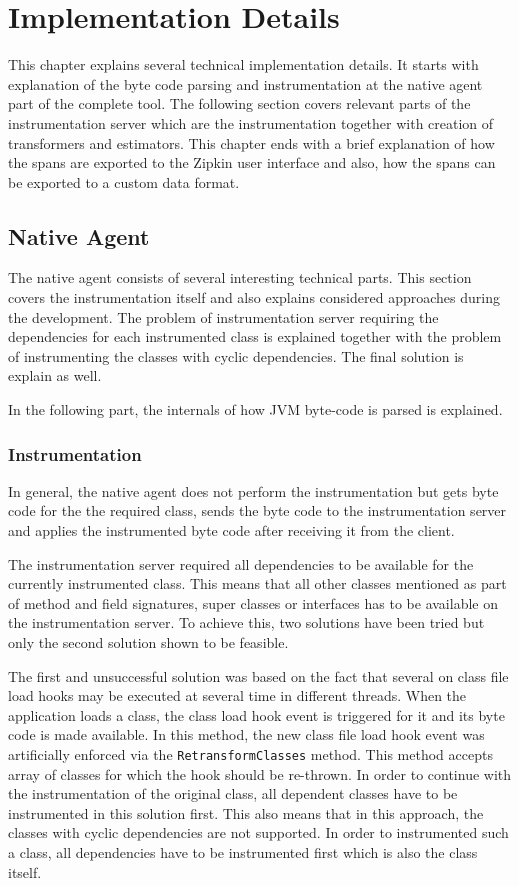 \chapter{Implementation Details}
\label{chap:implementation}
This chapter explains several technical implementation details. It starts with explanation of the byte code parsing and instrumentation at the native agent part of the complete tool. The following section covers relevant parts of the instrumentation server which are the instrumentation together with creation of transformers and estimators. This chapter ends with a brief explanation of how the spans are exported to the Zipkin user interface and also, how the spans can be exported to a custom data format.

\section{Native Agent}
The native agent consists of several interesting technical parts. This section covers the instrumentation itself and also explains considered approaches during the development. The problem of instrumentation server requiring the dependencies for each instrumented class is explained together with the problem of instrumenting the classes with cyclic dependencies. The final solution is explain as well. 

In the following part, the internals of how JVM byte-code is parsed is explained.
\subsection{Instrumentation}
In general, the native agent does not perform the instrumentation but gets byte code for the the required class, sends the byte code to the instrumentation server and applies the instrumented byte code after receiving it from the client. 

The instrumentation server required all dependencies to be available for the currently instrumented class. This means that all other classes mentioned as part of method and field signatures, super classes or interfaces has to be available on the instrumentation server. To achieve this, two solutions have been tried but only the second solution shown to be feasible.

The first and unsuccessful solution was based on the fact that several on class file load hooks may be executed at several time in different threads. When the application loads a class, the class load hook event is triggered for it and its byte code is made available. In this method, the new class file load hook event was artificially enforced via the \texttt{RetransformClasses} method. This method accepts array of classes for which the hook should be re-thrown. In order to continue with the instrumentation of the original class, all dependent classes have to be instrumented in this solution first. This also means that in this approach, the classes with cyclic dependencies are not supported. In order to instrumented such a class, all dependencies have to be instrumented first which is also the class itself.

